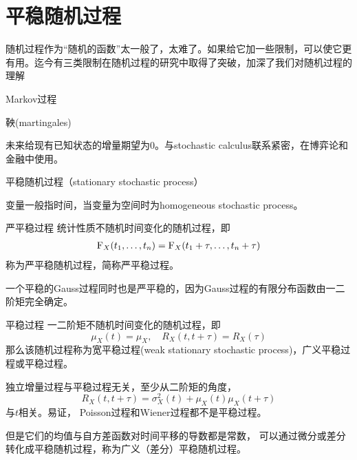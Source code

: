 \section{平稳随机过程}
随机过程作为“随机的函数”太一般了，太难了。如果给它加一些限制，可以使它更有用。迄今有三类限制在随机过程的研究中取得了突破，加深了我们对随机过程的理解
\begin{compactitem}
	\item Markov过程
	\item 鞅(martingales)
	
	未来给现有已知状态的增量期望为0。与stochastic calculus联系紧密，在博弈论和金融中使用。
	\item 平稳随机过程（stationary stochastic process）
	
	变量一般指时间，当变量为空间时为homogeneous stochastic process。
\end{compactitem}
\begin{definition}{严平稳过程}{}
	统计性质不随机时间变化的随机过程，即
	\begin{align*}
		\operatorname{F}_X(t_1,\ldots,t_n)=\operatorname{F}_X(t_1+\tau,\ldots,t_n+\tau)
	\end{align*}
	称为严平稳随机过程，简称严平稳过程。
\end{definition}
一个平稳的Gauss过程同时也是严平稳的，因为Gauss过程的有限分布函数由一二阶矩完全确定。
\begin{definition}{平稳过程}{}
	一二阶矩不随机时间变化的随机过程，即
	\begin{equation}
		\mu_X(t)=\mu_X,\quad R_X(t,t+\tau)=R_X(\tau)
	\end{equation}
	那么该随机过程称为宽平稳过程(weak stationary stochastic process)，广义平稳过程或平稳过程。
\end{definition}
独立增量过程与平稳过程无关，至少从二阶矩的角度，
\[
	R_X(t,t+\tau)=\sigma^2_X(t)+\mu_X(t)\mu_X(t+\tau)
\]
与$t$相关。易证，
Poisson过程和Wiener过程都不是平稳过程。

但是它们的均值与自方差函数对时间平移的导数都是常数，
可以通过微分或差分转化成平稳随机过程，称为广义（差分）平稳随机过程。
